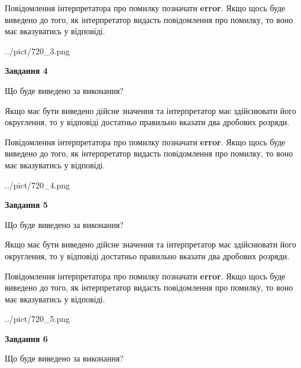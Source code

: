 \documentclass[12pt, ukrainian]{article}
\begin{document}
{\begin {Large}
Повідомлення інтерпретатора про помилку позначати \textbf{error}.
Якщо щось буде виведено до того, як інтерпретатор видасть повідомлення про помилку, 
то воно має вказуватись у відповіді. \par

\begin{center}
	{../pict/720_3.png}
\end{center}
\newpage

{\begin {center}\textbf{Завдання 4}\end {center}}\par
Що буде виведено за виконання? \par

Якщо має бути виведено дійсне значення та інтерпретатор має здійснювати його округлення, 
то у відповіді достатньо правильно вказати два дробових розряди.

Повідомлення інтерпретатора про помилку позначати \textbf{error}.
Якщо щось буде виведено до того, як інтерпретатор видасть повідомлення про помилку, 
то воно має вказуватись у відповіді. \par

\begin{center}
	{../pict/720_4.png}
\end{center}
\newpage

{\begin {center}\textbf{Завдання 5}\end {center}}\par
Що буде виведено за виконання? \par

Якщо має бути виведено дійсне значення та інтерпретатор має здійснювати його округлення, 
то у відповіді достатньо правильно вказати два дробових розряди.

Повідомлення інтерпретатора про помилку позначати \textbf{error}.
Якщо щось буде виведено до того, як інтерпретатор видасть повідомлення про помилку, 
то воно має вказуватись у відповіді. \par

\begin{center}
	{../pict/720_5.png}
\end{center}
\newpage

{\begin {center}\textbf{Завдання 6}\end {center}}\par
Що буде виведено за виконання? \par


\end{Large}}
\end{document}
